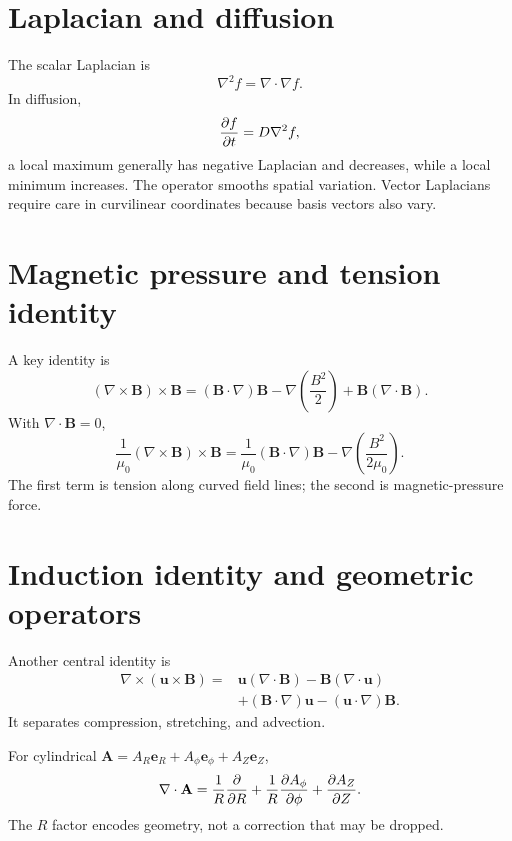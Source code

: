 \documentclass[11pt]{article}
\begin{document}
\section{Laplacian and diffusion}

The scalar Laplacian is
\begin{equation}
\nabla^2f=\nabla\cdot\nabla f.
\end{equation}
In diffusion,
\begin{equation}
\pdv{f}{t}=D\nabla^2f,
\end{equation}
a local maximum generally has negative Laplacian and decreases, while a local minimum increases. The operator smooths spatial variation. Vector Laplacians require care in curvilinear coordinates because basis vectors also vary.


\section{Magnetic pressure and tension identity}

A key identity is
\begin{equation}
(\nabla\times\mathbf B)\times\mathbf B
=(\mathbf B\cdot\nabla)\mathbf B
-\nabla\left(\frac{B^2}{2}\right)
+\mathbf B(\nabla\cdot\mathbf B).
\end{equation}
With $\nabla\cdot\mathbf B=0$,
\begin{equation}
\frac{1}{\mu_0}(\nabla\times\mathbf B)\times\mathbf B
=\frac{1}{\mu_0}(\mathbf B\cdot\nabla)\mathbf B
-\nabla\left(\frac{B^2}{2\mu_0}\right).
\end{equation}
The first term is tension along curved field lines; the second is magnetic-pressure force.


\section{Induction identity and geometric operators}

Another central identity is
\begin{align}
\nabla\times(\mathbf u\times\mathbf B)
={}&\mathbf u(\nabla\cdot\mathbf B)-\mathbf B(\nabla\cdot\mathbf u)\\
&+(\mathbf B\cdot\nabla)\mathbf u-(\mathbf u\cdot\nabla)\mathbf B.
\end{align}
It separates compression, stretching, and advection.

For cylindrical $\mathbf A=A_R\mathbf e_R+A_\phi\mathbf e_\phi+A_Z\mathbf e_Z$,
\begin{equation}
\nabla\cdot\mathbf A
=\frac{1}{R}\pdv{}{R}(RA_R)
+\frac{1}{R}\pdv{A_\phi}{\phi}
+\pdv{A_Z}{Z}.
\end{equation}
The $R$ factor encodes geometry, not a correction that may be dropped.
\end{document}

